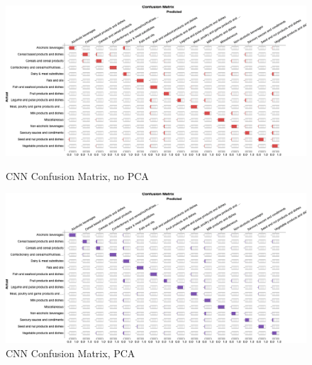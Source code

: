 \documentclass[12pt,a4paper]{article}
\begin{document}
    \begin{figure}[h]
        \centering

        \begin{minipage}{0.48\textwidth}
            \centering
            \includegraphics[width=\textwidth]{cnn-nopca-conf-mat} %
            \caption{CNN Confusion Matrix, no PCA}
            \label{fig:cnn-nopca-conf-mat}
        \end{minipage}\hfill

        \begin{minipage}{0.48\textwidth}
            \centering
            \includegraphics[width=\textwidth]{cnn-pca-conf-mat} %
            \caption{CNN Confusion Matrix, PCA}
            \label{fig:cnn-pca-conf-mat}
        \end{minipage}

    \end{figure}

    \clearpage
\end{document}
